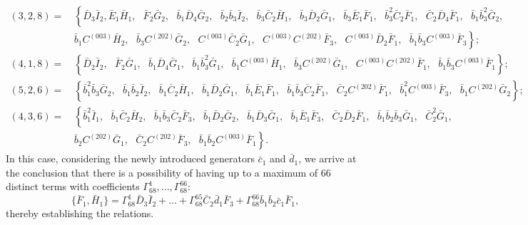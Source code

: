 \documentclass[10pt]{amsart}
\theoremstyle{definition}
\theoremstyle{corollary}
\theoremstyle{remark}
\theoremstyle{conclusion}
\begin{document}
    \begin{align*}
     (3,2,8) = & \, \left\{\bar{D}_3 \bar{I}_2,\bar{E}_1 \bar{H}_1, \text{ }\bar{F}_2 \bar{G}_2, \text{ }\bar{b}_1 \bar{D}_4 \bar{G}_2, \text{ }\bar{b}_2 \bar{b}_3 \bar{I}_2, \text{ }\bar{b}_3 \bar{C}_2 \bar{H}_1, \text{ }\bar{b}_3 \bar{D}_2 \bar{G}_1, \text{ }\bar{b}_3 \bar{E}_1 \bar{F}_1, \text{ }\bar{b}_3^2 \bar{C}_2 \bar{F}_1, \text{ }\bar{C}_2 \bar{D}_4 \bar{F}_1, \text{ }\bar{b}_1 \bar{b}_3^2 \bar{G}_2, \right. \\
     & \, \left. \bar{b}_1 C^{(003)} \bar{H}_2, \text{ }\bar{b}_3 C^{(202)} \bar{G}_2, \text{ }C^{(003)} \bar{C}_2 \bar{G}_1, \text{ }C^{(003)} C^{(202)} \bar{F}_3, \text{ }C^{(003)} \bar{D}_2 \bar{F}_1, \text{ }\bar{b}_1 \bar{b}_3 C^{(003)} \bar{F}_3\right\} ;\\
     (4,1,8)= & \, \left\{\bar{D}_2 \bar{I}_2, \text{ }\bar{F}_2 \bar{G}_1, \text{ }\bar{b}_1 \bar{D}_4 \bar{G}_1, \text{ }\bar{b}_1 \bar{b}_3^2 \bar{G}_1, \text{ }\bar{b}_1 C^{(003)} \bar{H}_1, \text{ }\bar{b}_3 C^{(202)} \bar{G}_1, \text{ }C^{(003)} C^{(202)} \bar{F}_1, \text{ }\bar{b}_1 \bar{b}_3 C^{(003)} \bar{F}_1\right\} ;\\
     (5,2,6)= & \, \left\{\bar{b}_1^2 \bar{b}_3 \bar{G}_2, \text{ }\bar{b}_1 \bar{b}_2 \bar{I}_2, \text{ }\bar{b}_1 \bar{C}_2 \bar{H}_1, \text{ }\bar{b}_1 \bar{D}_2 \bar{G}_1, \text{ }\bar{b}_1 \bar{E}_1 \bar{F}_1, \text{ }\bar{b}_1 \bar{b}_3 \bar{C}_2 \bar{F}_1, \text{ }\bar{C}_2 C^{(202)} \bar{F}_1, \text{ }\bar{b}_1^2 C^{(003)} \bar{F}_3, \text{ }\bar{b}_1 C^{(202)} \bar{G}_2\right\} ;\\
     (4,3,6) = & \, \left\{\bar{b}_1^2 \bar{I}_1, \text{ }\bar{b}_1 \bar{C}_2 \bar{H}_2, \text{ }\bar{b}_1 \bar{b}_3 \bar{C}_2 \bar{F}_3, \text{ }\bar{b}_1 \bar{D}_2 \bar{G}_2, \text{ }\bar{b}_1 \bar{D}_3 \bar{G}_1, \text{ }\bar{b}_1 \bar{E}_1 \bar{F}_3, \text{ }\bar{C}_2 \bar{D}_2 \bar{F}_1, \text{ }\bar{b}_1 \bar{b}_2 \bar{b}_3 \bar{G}_1, \text{ }\bar{C}_2^2 \bar{G}_1,\right. \\
     & \, \left. \bar{b}_2 C^{(202)} \bar{G}_1, \text{ }\bar{C}_2 C^{(202)} \bar{F}_3, \text{ }\bar{b}_1 \bar{b}_2 C^{(003)} \bar{F}_1\right\}.
\end{align*}In this case, considering the newly introduced generators $\bar{c}_1$ and $\bar{d}_1$, we arrive at the conclusion that there is a possibility of having up to a maximum of $66$ distinct terms with coefficients $\Gamma_{68}^1,\ldots,\Gamma_{68}^{66}$: $$ \{\bar{F}_1,\bar{H}_1\} = \Gamma_{68}^1\bar{D}_3 \bar{I}_2 +   \ldots + \Gamma_{68}^{65} \bar{C}_2\bar{d}_1 \bar{F}_3+\Gamma_{68}^{66}\bar{b}_1 \bar{b}_2 \bar{c}_1 \bar{F}_1,$$ thereby establishing the relations. %
\end{document}
